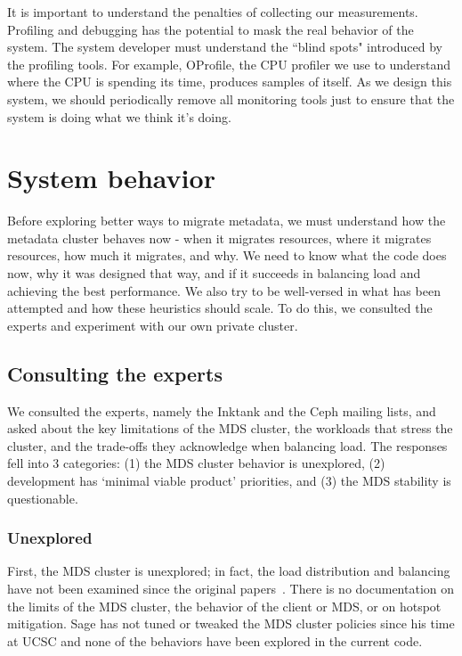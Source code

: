 It is important to understand the penalties of collecting our measurements. Profiling and debugging has the potential to mask the real behavior of the system. The system developer must understand the ``blind spots" introduced by the profiling tools. For example, OProfile, the CPU profiler we use to understand where the CPU is spending its time, produces samples of itself. As we design this system, we should periodically remove all monitoring tools just to ensure that the system is doing what we think it's doing. 


\section{System behavior}
\label{results_system-behavior}
Before exploring better ways to migrate metadata, we must understand how the metadata cluster behaves now - when it migrates resources, where it migrates resources, how much it migrates, and why. We need to know what the code does now, why it was designed that way, and if it succeeds in balancing load and achieving the best performance. We also try to be well-versed in what has been attempted and how these heuristics should scale. To do this, we consulted the experts and experiment with our own private cluster. 

\subsection{Consulting the experts}
We consulted the experts, namely the Inktank and the Ceph mailing lists, and asked about the key limitations of the MDS cluster, the workloads that stress the cluster, and the trade-offs they acknowledge when balancing load. The responses fell into 3 categories: (1) the MDS cluster behavior is unexplored, (2) development has `minimal viable product' priorities, and (3) the MDS stability is questionable.

\subsubsection{Unexplored}
First, the MDS cluster is unexplored; in fact, the load distribution and balancing have not been examined since the original papers~\cite{weil:sc2004-dyn-metadata,weil:osdi2006-ceph}. There is no documentation on the limits of the MDS cluster, the behavior of the client or MDS, or on hotspot mitigation. Sage has not tuned or tweaked the MDS cluster policies since his time at UCSC and none of the behaviors have been explored in the current code. \\

